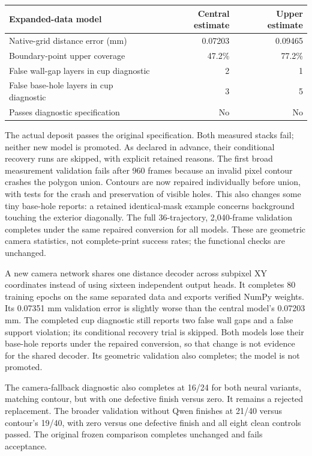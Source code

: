 \documentclass[10pt,letterpaper]{article}
\begin{document}
\begin{center}
\begin{tabularx}{\linewidth}{@{}Yrr@{}}
\toprule
Expanded-data model & Central estimate & Upper estimate\\
\midrule
Native-grid distance error (mm) & 0.07203 & 0.09465\\
Boundary-point upper coverage & 47.2\% & 77.2\%\\
False wall-gap layers in cup diagnostic & 2 & 1\\
False base-hole layers in cup diagnostic & 3 & 5\\
Passes diagnostic specification & No & No\\
\bottomrule
\end{tabularx}
\end{center}
The actual deposit passes the original specification. Both measured stacks fail;
neither new model is promoted. As declared in advance, their conditional recovery
runs are skipped, with explicit retained reasons. The first broad measurement
validation fails after 960 frames because an invalid pixel contour crashes the
polygon union. Contours are now repaired individually before union, with tests
for the crash and preservation of visible holes. This also changes some tiny
base-hole reports: a retained identical-mask example concerns background touching
the exterior diagonally. The full 36-trajectory, 2,040-frame validation completes
under the same repaired conversion for all models. These are geometric camera
statistics, not complete-print success rates; the functional checks are unchanged.

A new camera network shares one distance decoder across subpixel XY coordinates
instead of using sixteen independent output heads. It completes 80 training epochs
on the same separated data and exports verified NumPy weights. Its 0.07351 mm
validation error is slightly worse than the central model's 0.07203 mm. The
completed cup diagnostic still reports two false wall gaps and a false support
violation; its conditional recovery trial is skipped. Both models lose their
base-hole reports under the repaired conversion, so that change is not evidence
for the shared decoder. Its geometric validation also completes; the model is not promoted.

The camera-fallback diagnostic also completes at 16/24 for both neural variants,
matching contour, but with one defective finish versus zero. It remains a rejected
replacement. The broader validation without Qwen finishes at 21/40 versus
contour's 19/40, with zero versus one defective finish and all eight clean controls
passed. The original frozen comparison completes unchanged and fails acceptance.
\end{document}

